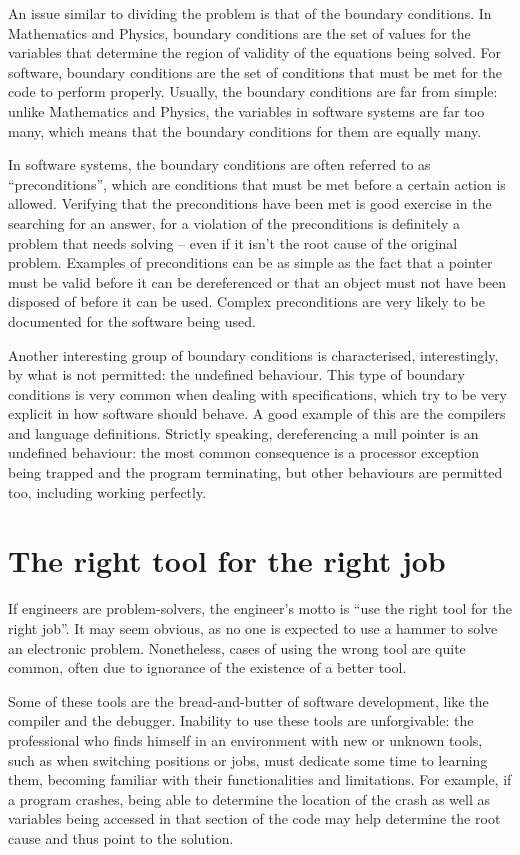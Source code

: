 An issue similar to dividing the problem is that of the boundary conditions. In Mathematics and Physics, boundary conditions are the set of values for the variables that determine the region of validity of the equations being solved. For software, boundary conditions are the set of conditions that must be met for the code to perform properly. Usually, the boundary conditions are far from simple: unlike Mathematics and Physics, the variables in software systems are far too many, which means that the boundary conditions for them are equally many.

In software systems, the boundary conditions are often referred to as “preconditions”, which are conditions that must be met before a certain action is allowed. Verifying that the preconditions have been met is good exercise in the searching for an answer, for a violation of the preconditions is definitely a problem that needs solving – even if it isn’t the root cause of the original problem. Examples of preconditions can be as simple as the fact that a pointer must be valid before it can be dereferenced or that an object must not have been disposed of before it can be used. Complex preconditions are very likely to be documented for the software being used.

Another interesting group of boundary conditions is characterised, interestingly, by what is not permitted: the undefined behaviour. This type of boundary conditions is very common when dealing with specifications, which try to be very explicit in how software should behave. A good example of this are the compilers and language definitions. Strictly speaking, dereferencing a null pointer is an undefined behaviour: the most common consequence is a processor exception being trapped and the program terminating, but other behaviours are permitted too, including working perfectly.

\section*{The right tool for the right job}

If engineers are problem-solvers, the engineer’s motto is “use the right tool for the right job”. It may seem obvious, as no one is expected to use a hammer to solve an electronic problem. Nonetheless, cases of using the wrong tool are quite common, often due to ignorance of the existence of a better tool.

Some of these tools are the bread-and-butter of software development, like the compiler and the debugger. Inability to use these tools are unforgivable: the professional who finds himself in an environment with new or unknown tools, such as when switching positions or jobs, must dedicate some time to learning them, becoming familiar with their functionalities and limitations. For example, if a program crashes, being able to determine the location of the crash as well as variables being accessed in that section of the code may help determine the root cause and thus point to the solution.

